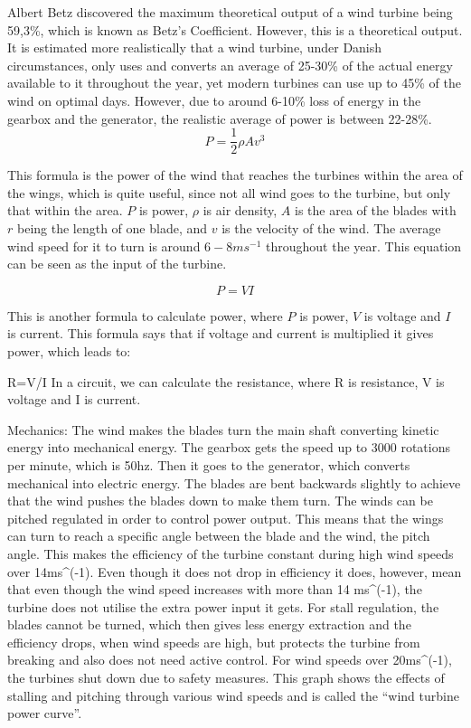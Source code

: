 \documentclass[12pt]{article}
\begin{document}
Albert Betz discovered the maximum theoretical output of a wind turbine being 59,3\%, which is known as Betz’s Coefficient.  However, this is a theoretical output. It is estimated more realistically that a wind turbine, under Danish circumstances, only uses and converts an average of 25-30\% of the actual energy available to it throughout the year, yet modern turbines can use up to 45\% of the wind on optimal days.  However, due to around 6-10\% loss of energy in the gearbox and the generator, the realistic average of power is between 22-28\%. 
\begin{equation}
P = \frac{1}{2} \rho A v^3
\label{equation:Windpower}
\end{equation}

This formula is the power of the wind that reaches the turbines within the area of the wings, which is quite useful, since not all wind goes to the turbine, but only that within the area. $P$ is power, $\rho$ is air density, $A$ is the area of the blades with $r$ being the length of one blade, and $v$ is the velocity of the wind. The average wind speed for it to turn is around $6-8 ms^{-1}$ throughout the year. This equation can be seen as the input of the turbine.


\begin{equation}

P=VI
\label{equation:Power}
\end{equation}


This is another formula to calculate power, where $P$ is power, $V$ is voltage and $I$ is current. This formula says that if voltage and current is multiplied it gives power, which leads to:

R=V/I
In a circuit, we can calculate the resistance, where R is resistance, V is voltage and I is current.

Mechanics:
The wind makes the blades turn the main shaft converting kinetic energy into mechanical energy. The gearbox gets the speed up to 3000 rotations per minute, which is 50hz. Then it goes to the generator, which converts mechanical into electric energy.
The blades are bent backwards slightly to achieve that the wind pushes the blades down to make them turn. 
The winds can be pitched regulated in order to control power output. This means that the wings can turn to reach a specific angle between the blade and the wind, the pitch angle. This makes the efficiency of the turbine constant during high wind speeds over 14ms^(-1). Even though it does not drop in efficiency it does, however, mean that even though the wind speed increases with more than 14 ms^(-1), the turbine does not utilise the extra power input it gets. For stall regulation, the blades cannot be turned, which then gives less energy extraction and the efficiency drops, when wind speeds are high, but protects the turbine from breaking and also does not need active control. For wind speeds over 20ms^(-1), the turbines shut down due to safety measures.  
This graph shows the effects of stalling and pitching through various wind speeds and is called the “wind turbine power curve”.
\end{document}
